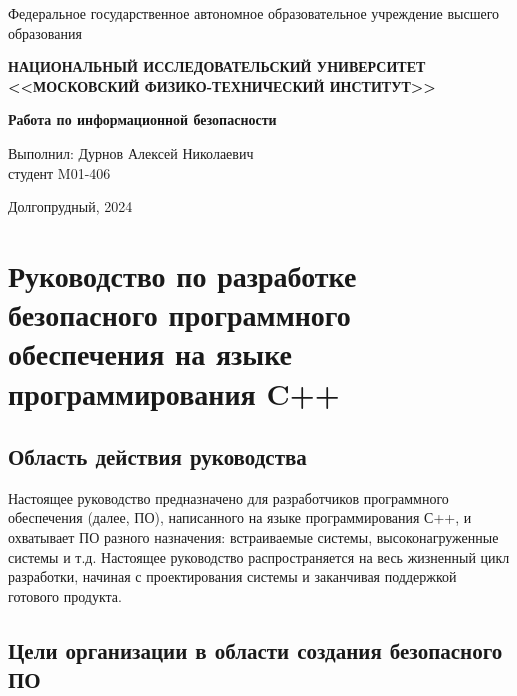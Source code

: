 
\newcommand{\boldm}[1]{{\boldsymbol{#1}}}

\usepackage{upgreek}


\begin{center}

    \normalsize{Федеральное государственное автономное образовательное учреждение высшего образования}

    \textbf{НАЦИОНАЛЬНЫЙ ИССЛЕДОВАТЕЛЬСКИЙ УНИВЕРСИТЕТ \\ <<МОСКОВСКИЙ ФИЗИКО-ТЕХНИЧЕСКИЙ ИНСТИТУТ>>}
    \vspace{13ex}

    \textbf{Работа по информационной безопасности}
    \vspace{40ex}
\end{center}
\begin{flushright}
    \normalsize{Выполнил: Дурнов Алексей Николаевич \\ студент M01-406 \\}
\end{flushright}

\vfill

\begin{center}
Долгопрудный, 2024
\end{center}

\thispagestyle{empty} %

\newpage

\tableofcontents{}
\newpage

\section{Руководство по разработке безопасного программного обеспечения на языке программирования C++}

\subsection{Область действия руководства}

Настоящее руководство предназначено для разработчиков программного обеспечения (далее, ПО), написанного на языке программирования С++, и охватывает ПО разного назначения: встраиваемые системы, высоконагруженные системы и т.д. Настоящее руководство распространяется на весь жизненный цикл разработки, начиная с проектирования системы и заканчивая поддержкой готового продукта.

\subsection{Цели организации в области создания безопасного ПО}


